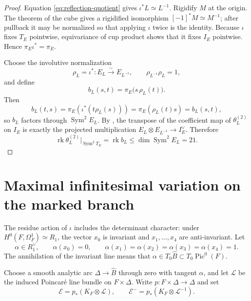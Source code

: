 \documentclass[11pt,reqno]{amsart}
\numberwithin{equation}{section}
\theoremstyle{definition}
\theoremstyle{remark}
\newcommand{\rk}{\operatorname{rk}}
\newcommand{\Pic}{\operatorname{Pic}}
\newcommand{\Sym}{\operatorname{Sym}}
\begin{document}
\begin{proof}
Equation \eqref{eq:reflection-quotient} gives $\iota^*L\simeq L^{-1}$.  Rigidify $M$ at the origin.  The theorem of the cube gives a rigidified isomorphism $[-1]^*M\simeq M^{-1}$; after pullback it may be normalized so that applying $\iota$ twice is the identity.  Because $\iota$ fixes $T_E$ pointwise, equivariance of cup product shows that it fixes $I_E$ pointwise.  Hence $\pi_E\iota^*=\pi_E$.

Choose the involutive normalization
\[
\rho_L=\iota^*:E_L\xrightarrow{\sim}E_{L^{-1}},
\qquad \rho_{L^{-1}}\rho_L=1,
\]
and define
\[
b_L(s,t)=\pi_E\bigl(s\,\rho_L(t)\bigr).
\]
Then
\[
b_L(t,s)=\pi_E\!\left(\iota^*(t\rho_L(s))\right)
=\pi_E(\rho_L(t)s)=b_L(s,t),
\]
so $b_L$ factors through $\Sym^2E_L$.  By \cite[Equation~(2.1) and the proof of Proposition~2.6]{KLM2026}, the transpose of the coefficient map of $\theta_L^{(2)}$ on $I_E$ is exactly the projected multiplication $E_L\otimes E_{L^{-1}}\to I_E^\vee$.  Therefore
\[
\rk\theta_L^{(2)}|_{\Sym^2T_E}
=\rk b_L
\le\dim\Sym^2E_L
=21.
\]
\end{proof}

\section{Maximal infinitesimal variation on the marked branch}\label{sec:eckardt-period}

The residue action of $\iota$ includes the determinant character: under
$H^0(F,\Omega_F^1)\simeq R_1$, the vector $x_0$ is invariant and
$x_1,\ldots,x_4$ are anti-invariant.  Let
\begin{equation}\label{eq:alpha}
\alpha\in R_1^\vee,
\qquad
\alpha(x_0)=0,
\qquad
\alpha(x_1)=\alpha(x_2)=\alpha(x_3)=\alpha(x_4)=1.
\end{equation}
The annihilation of the invariant line means that
$\alpha\in T_0\widehat B\subset T_0\Pic^0(F)$.

Choose a smooth analytic arc $\Delta\to\widehat B$ through zero with tangent
$\alpha$, and let $\mathscr L$ be the induced Poincar\'e line bundle on
$F\times\Delta$.  Write $p:F\times\Delta\to\Delta$ and set
\begin{equation}\label{eq:direct-images}
\mathscr E=p_*(K_F\otimes\mathscr L),
\qquad
\mathscr E^-=p_*(K_F\otimes\mathscr L^{-1}).
\end{equation}
\end{document}
